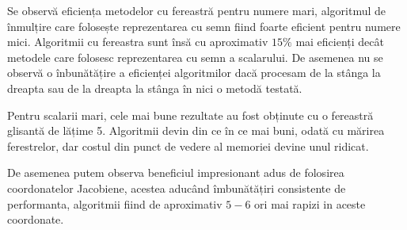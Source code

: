 Se observă eficiența metodelor cu fereastră pentru numere mari, algoritmul de înmulțire care folosește reprezentarea cu semn fiind foarte eficient pentru numere mici. Algoritmii cu fereastra sunt însă cu aproximativ $15\%$ mai eficienți decât metodele care folosesc reprezentarea cu semn a scalarului. De asemenea nu se observă o înbunătățire a eficienței algoritmilor dacă procesam de la stânga la dreapta sau de la dreapta la stânga în nici o metodă testată. 

Pentru scalarii mari, cele mai bune rezultate au fost obținute cu o fereastră glisantă de lățime 5. Algoritmii devin din ce în ce mai buni, odată cu mărirea ferestrelor, dar costul din punct de vedere al memoriei devine unul ridicat.

De asemenea putem observa beneficiul impresionant adus de folosirea coordonatelor Jacobiene, acestea aducând îmbunătățiri consistente de performanta, algoritmii fiind de aproximativ $5-6$ ori mai rapizi in aceste coordonate.

